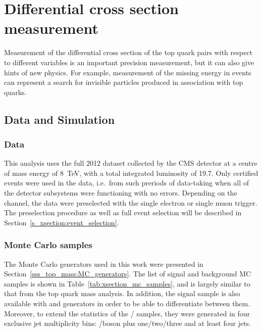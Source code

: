 
\chapter[Differential cross section measurement]{Differential cross section measurement}
\label{c:xsection_analysis}
\ifpdf
    \graphicspath{{06_Cross_section_analysis/plots/}}
\else
    \graphicspath{{06_Cross_section_analysis/plots/EPS/}{06_Cross_section_analysis/plots/}}
\fi

Measurement of the differential cross section of the top quark pairs with respect to different variables is an important
precision measurement, but it can also give hints of new physics. For example, measurement of the missing energy in
\ttbar events can represent a search for invisible particles produced in association with top quarks.

\section{Data and Simulation}
\label{s_xsection:data_and_simulation}

\subsection{Data}
\label{ss_xsection:data}
This analysis uses the full 2012 dataset collected by the CMS detector at a centre of mass energy of \SI{8}{\TeV}, with
a total integrated luminosity of \SI{19.7}{\fbinv}. Only certified events were used in the data, i.e.\ from such
preriods of data-taking when all of the detector subsystems were functioning with no errors. Depending on the channel,
the data were preselected with the single electron or single muon trigger. The preselection procedure as well as full
event selection will be described in Section~\ref{s_xsection:event_selection}.

\subsection{Monte Carlo samples}
\label{ss_xsection:MC_samples}
The Monte Carlo generators used in this work were presented in Section~\ref{sss_top_mass:MC_generators}. The list of
signal and background MC samples is shown in Table~\ref{tab:xsection_mc_samples}, and is largely similar to that from
the top quark mass analysis. In addition, the signal \ttjets sample is also available with \POWHEG and \MCATNLO
generators in order to be able to differentiate between them. Moreover, to extend the statistics of the \W/\ZpJets
samples, they were generated in four exclusive jet multiplicity bins: \W/\Z boson plus one/two/three and at least four
jets.

